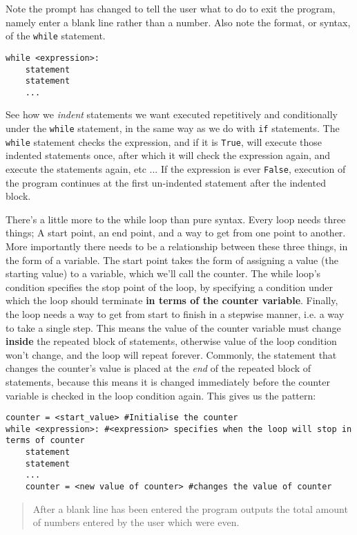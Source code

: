 Note the prompt has changed to tell the user what to do to exit the   program, namely enter a blank line rather than a number. Also note the   format, or syntax, of the \texttt{while} statement.
\begin{lstlisting}
while <expression>:
    statement
    statement
    ...
\end{lstlisting}

See how we \textit{indent} statements we want executed repetitively and   conditionally under the \texttt{while} statement, in the same way as we do with   \texttt{if} statements. The \texttt{while} statement checks the expression, and if it is   \texttt{True}, will execute those indented statements once, after which it will   check the expression again, and execute the statements again, etc ... If the   expression is ever \texttt{False}, execution of the program continues at the   first un-indented statement after the indented block.

There's a little more to the while loop than pure syntax. Every   loop needs three things; A start point, an end point, and a way to get   from one point to another. More importantly there needs to be a   relationship between these three things, in the form of a variable. The   start point takes the form of assigning a value (the starting value) to   a variable, which we'll call the counter. The while loop's condition   specifies the stop point of the loop, by specifying a condition under   which the loop should terminate \textbf{in terms of the counter   variable}. Finally, the loop needs a way to get from start to   finish in a stepwise manner, i.e. a way to take a single step. This   means the value of the counter variable must change   \textbf{inside} the repeated block of statements, otherwise   value of the loop condition won't change, and the loop will repeat   forever. Commonly, the statement that changes the counter's   value is placed at the \textit{end} of the repeated block of   statements, because this means it is changed immediately before the   counter variable is checked in the loop condition again. This gives us   the pattern:
\begin{lstlisting}
counter = <start_value> #Initialise the counter
while <expression>: #<expression> specifies when the loop will stop in terms of counter
    statement
    statement
    ...
    counter = <new value of counter> #changes the value of counter
\end{lstlisting}
\begin{quotation}     After a blank line has been entered the program outputs the total amount    of numbers entered by the user which were even.    
\end{quotation}

